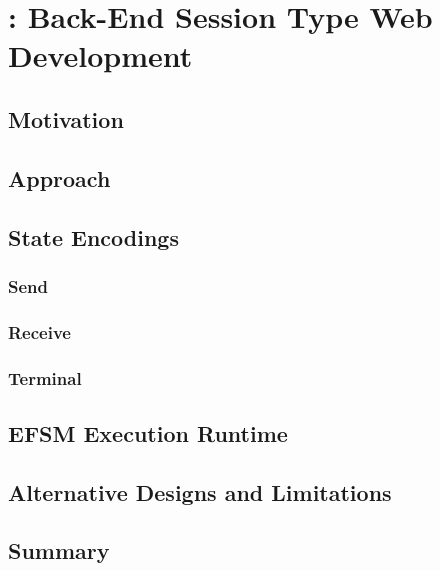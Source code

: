 \chapter{: Back-End Session Type Web Development}

\section{Motivation}

\section{Approach}

\section{State Encodings}

\subsection{Send}

\subsection{Receive}

\subsection{Terminal}

\section{EFSM Execution Runtime}

\section{Alternative Designs and Limitations}

\section{Summary}